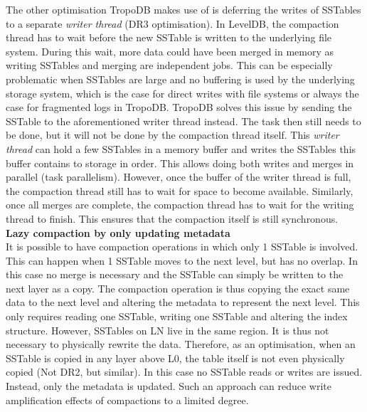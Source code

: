 The other optimisation TropoDB makes use of is deferring the writes of SSTables to a separate \textit{writer thread} (DR3 optimisation). In LevelDB, the compaction thread has to wait before the new SSTable is written to the underlying file system. During this wait, more data could have been merged in memory as writing SSTables and merging are independent jobs. This can be especially problematic when SSTables are large and no buffering is used by the underlying storage system, which is the case for direct writes with file systems or always the case for fragmented logs in TropoDB. TropoDB solves this issue by sending the SSTable to the aforementioned writer thread instead. The task then still needs to be done, but it will not be done by the compaction thread itself. This \textit{writer thread} can hold a few SSTables in a memory buffer and writes the SSTables this buffer contains to storage in order. This allows doing both writes and merges in parallel (task parallelism). However, once the buffer of the writer thread is full, the compaction thread still has to wait for space to become available. Similarly, once all merges are complete, the compaction thread has to wait for the writing thread to finish. This ensures that the compaction itself is still synchronous.\\
\textbf{Lazy compaction by only updating metadata}\\
It is possible to have compaction operations in which only 1 SSTable is involved. This can happen when 1 SSTable moves to the next level, but has no overlap. In this case no merge is necessary and the SSTable can simply be written to the next layer as a copy. The compaction operation is thus copying the exact same data to the next level and altering the metadata to represent the next level. This only requires reading one SSTable, writing one SSTable and altering the index structure. However, SSTables on LN live in the same region. It is thus not necessary to physically rewrite the data. Therefore, as an optimisation, when an SSTable is copied in any layer above L0, the table itself is not even physically copied (Not DR2, but similar). In this case no SSTable reads or writes are issued. Instead, only the metadata is updated. Such an approach can reduce write amplification effects of compactions to a limited degree.

